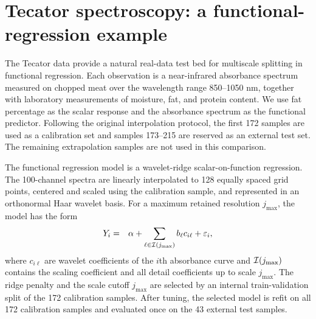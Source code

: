 

\section{Tecator spectroscopy: a functional-regression example}

The Tecator data provide a natural real-data test bed for multiscale splitting in
functional regression.  Each observation is a near-infrared absorbance spectrum
measured on chopped meat over the wavelength range 850--1050 nm, together with
laboratory measurements of moisture, fat, and protein content.  We use fat
percentage as the scalar response and the absorbance spectrum as the functional
predictor.  Following the original interpolation protocol, the first 172 samples
are used as a calibration set and samples 173--215 are reserved as an external
test set.  The remaining extrapolation samples are not used in this comparison.

The functional regression model is a wavelet-ridge scalar-on-function regression.
The 100-channel spectra are linearly interpolated to 128 equally spaced grid
points, centered and scaled using the calibration sample, and represented in an
orthonormal Haar wavelet basis.  For a maximum retained resolution $j_{\max}$,
the model has the form
\begin{eqnarray}
Y_i &=& \alpha + \sum_{\ell \in {\cal I}(j_{\max})} b_\ell c_{i\ell} + \varepsilon_i,
\end{eqnarray}
where $c_{i\ell}$ are wavelet coefficients of the $i$th absorbance curve and
${\cal I}(j_{\max})$ contains the scaling coefficient and all detail
coefficients up to scale $j_{\max}$.  The ridge penalty and the scale cutoff
$j_{\max}$ are selected by an internal train-validation split of the 172
calibration samples.  After tuning, the selected model is refit on all 172
calibration samples and evaluated once on the 43 external test samples.

